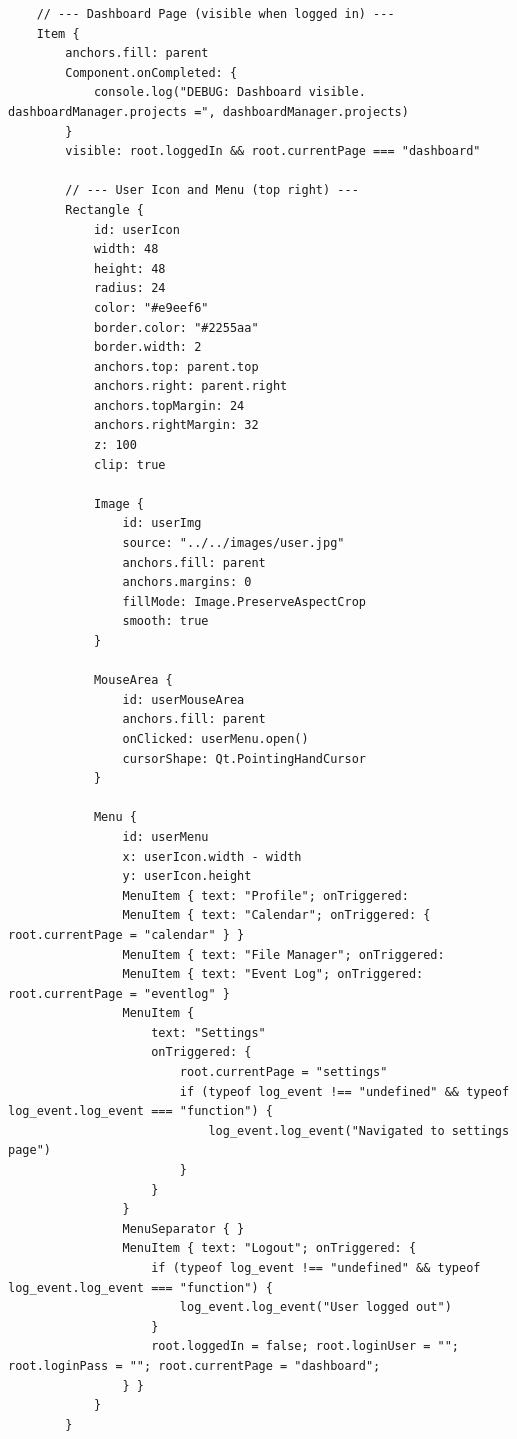 \documentclass{report}
\begin{document}
\begin{lstlisting}
    // --- Dashboard Page (visible when logged in) ---
    Item {
        anchors.fill: parent
        Component.onCompleted: {
            console.log("DEBUG: Dashboard visible. dashboardManager.projects =", dashboardManager.projects)
        }
        visible: root.loggedIn && root.currentPage === "dashboard"

        // --- User Icon and Menu (top right) ---
        Rectangle {
            id: userIcon
            width: 48
            height: 48
            radius: 24
            color: "#e9eef6"
            border.color: "#2255aa"
            border.width: 2
            anchors.top: parent.top
            anchors.right: parent.right
            anchors.topMargin: 24
            anchors.rightMargin: 32
            z: 100
            clip: true

            Image {
                id: userImg
                source: "../../images/user.jpg"
                anchors.fill: parent
                anchors.margins: 0
                fillMode: Image.PreserveAspectCrop
                smooth: true
            }

            MouseArea {
                id: userMouseArea
                anchors.fill: parent
                onClicked: userMenu.open()
                cursorShape: Qt.PointingHandCursor
            }

            Menu {
                id: userMenu
                x: userIcon.width - width
                y: userIcon.height
                MenuItem { text: "Profile"; onTriggered: 
                MenuItem { text: "Calendar"; onTriggered: { root.currentPage = "calendar" } }
                MenuItem { text: "File Manager"; onTriggered:
                MenuItem { text: "Event Log"; onTriggered: root.currentPage = "eventlog" }
                MenuItem {
                    text: "Settings"
                    onTriggered: {
                        root.currentPage = "settings"
                        if (typeof log_event !== "undefined" && typeof log_event.log_event === "function") {
                            log_event.log_event("Navigated to settings page")
                        }
                    }
                }
                MenuSeparator { }
                MenuItem { text: "Logout"; onTriggered: {
                    if (typeof log_event !== "undefined" && typeof log_event.log_event === "function") {
                        log_event.log_event("User logged out")
                    }
                    root.loggedIn = false; root.loginUser = ""; root.loginPass = ""; root.currentPage = "dashboard";
                } }
            }
        }


\end{lstlisting}
\end{document}
